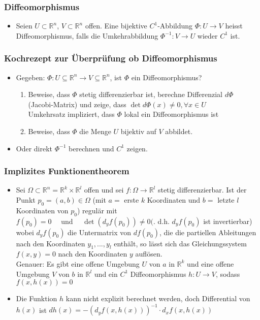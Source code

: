 \documentclass[a3paper, 11pt, landscape]{scrartcl}
\newcommand{\Rn}{\mathbb{R}^n}
\begin{document}
\begin{multicols*}{3}
	\subsubsection{Diffeomorphismus}
	\begin{itemize}
	    \item Seien $U \subset \mathbb{R}^n$, $V \subset \mathbb{R}^n$ offen. Eine bijektive $C^1$-Abbildung $\Phi: U \to V$ heisst Diffeomorphismus, falls die Umkehrabbildung $\Phi^{-1}: V \to U$ wieder $C^1$ ist.
	\end{itemize}
	
	\subsubsection{Kochrezept zur Überprüfung ob Diffeomorphismus}
	\begin{itemize}
	    \item Gegeben: $\Phi:U\subseteq\Rn\to V\subseteq\Rn$, ist $\Phi$ ein Diffeomorphismus?
	    \begin{enumerate}
	        \item Beweise, dass $\Phi$ stetig differenzierbar ist, berechne Differenzial $d\Phi$ (Jacobi-Matrix) und zeige, dass $\det d\Phi(x)\neq 0,\forall x \in U$\\
	        Umkehrsatz impliziert, dass $\Phi$ lokal ein Diffeomorphismus ist
	        \item Beweise, dass $\Phi$ die Menge $U$ bijektiv auf $V$ abbildet.
	    \end{enumerate}
	    \item Oder direkt $\Phi^{-1}$ berechnen und $C^1$ zeigen.
	\end{itemize}
	
	\subsubsection{Implizites Funktionentheorem}
	\begin{itemize}
	    \item Sei $\Omega \subset \mathbb{R}^{n}=\mathbb{R}^{k} \times \mathbb{R}^{l}$ offen und sei $f: \Omega \rightarrow \mathbb{R}^{l}$ stetig differenzierbar. Ist der Punkt $p_{0}=(a, b) \in \Omega$  (mit $a=$ erste $k$ Koordinaten und $b=$ letzte $l$ Koordinaten von $p_{0}$) regulär mit\\
        $f(p_{0})=0 \quad$ und $\quad \operatorname{det}(d_{y} f(p_{0})) \neq 0(.$ d.h. $d_{y} f(p_{0})$ ist invertierbar)\\
        wobei $d_{y} f(p_{0})$ die Untermatrix von $d f(p_{0})$, die die partiellen Ableitungen nach den Koordinaten $y_{1}, ...,y_{l}$ enthält, so lässt sich das Gleichungssystem $f(x, y)=0$ nach den Koordinaten $y$ auflösen. \\
        Genauer: Es gibt eine offene Umgebung $U$ von $a$ in $\mathbb{R}^{k}$ und eine offene Umgebung $V$ von $b$ in $\mathbb{R}^{l}$ und ein $C^{1}$ Diffeomorphismus $h: U \rightarrow V$, sodass $f(x, h(x))=0 $
        \item Die Funktion $h$ kann nicht explizit berechnet werden, doch Differential von $h(x)$ ist $d h(x)=-(d_{y} f(x, h(x)))^{-1} \cdot d_{x} f(x, h(x))$
	\end{itemize} 
	

\end{multicols*}
\end{document}
